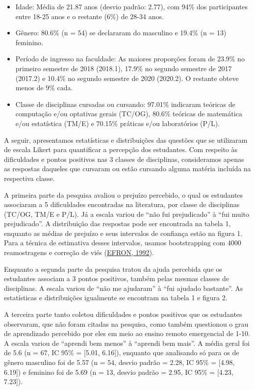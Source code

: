 \documentclass[
  12pt,
  portuguese,
]{article}
\providecommand{\tightlist}{%
  \setlength{\itemsep}{0pt}\setlength{\parskip}{0pt}}
\begin{document}
\begin{itemize}
\tightlist
\item
  Idade: Média de 21.87 anos (desvio padrão: 2.77), com 94\% dos
  participantes entre 18-25 anos e o restante (6\%) de 28-34 anos.
\item
  Gênero: 80.6\% (n = 54) se declararam do masculino e 19.4\% (n = 13)
  feminino.
\item
  Período de ingresso na faculdade: As maiores proporções foram de
  23.9\% no primeiro semestre de 2018 (2018.1), 17.9\% no segundo
  semestre de 2017 (2017.2) e 10.4\% no segundo semestre de 2020
  (2020.2). O restante obteve menos de 9\% cada.
\item
  Classe de disciplinas cursadas ou cursando: 97.01\% indicaram teóricas
  de computação e/ou optativas gerais (TC/OG), 80.6\% teóricas de
  matemática e/ou estatística (TM/E) e 70.15\% práticas e/ou
  laboratórios (P/L).
\end{itemize}

A seguir, apresentamos estatísticas e distribuições das questões que se
utilizaram de escala Likert para quantificar a percepção dos estudantes.
Com respeito às dificuldades e pontos positivos nas 3 classes de
disciplinas, consideramos apenas as respostas daqueles que cursaram ou
estão cursando alguma matéria incluída na respectiva classe.

A primeira parte da pesquisa avaliou o prejuízo percebido, o qual os
estudantes associaram a 5 dificuldades encontradas na literatura, por
classe de disciplinas (TC/OG, TM/E e P/L). Já a escala variou de ``não
fui prejudicado'' à ``fui muito prejudicado''. A distribuição das
respostas pode ser encontrada na tabela 1, enquanto as médias de
prejuízo e seus intervalos de confiança estão na figura 1. Para a
técnica de estimativa desses intervalos, usamos bootstrapping com 4000
reamostragens e correção de viés
(\protect\hyperlink{ref-efron1992bootstrap}{EFRON, 1992}).

Enquanto a segunda parte da pesquisa tratou da ajuda percebida que os
estudantes associam a 3 pontos positivos, também pelas mesmas classes de
disciplinas. A escala variou de ``não me ajudaram'' à ``fui ajudado
bastante''. As estatísticas e distribuições igualmente se encontram na
tabela 1 e figura 2.

A terceira parte tanto coletou dificuldades e pontos positivos que os
estudantes observaram, que não foram citadas na pesquisa, como também
questionou o grau de aprendizado percebido por eles em meio ao ensino
remoto emergencial de 1-10. A escala variou de ``aprendi bem menos'' à
``aprendi bem mais''. A média geral foi de 5.6 (n = 67, IC 95\% =
{[}5.01, 6.16{]}), enquanto que analisando só para os de gênero
masculino foi de 5.57 (n = 54, desvio padrão = 2.28, IC 95\% = {[}4.98,
6.19{]}) e feminino foi de 5.69 (n = 13, desvio padrão = 2.95, IC 95\% =
{[}4.23, 7.23{]}).
\end{document}
